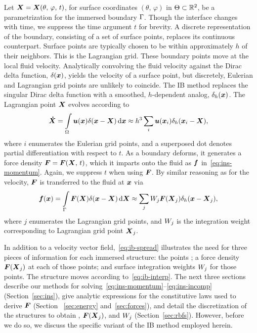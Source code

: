 Let $\boldsymbol{X} = \boldsymbol{X}(\theta,\,\varphi,\,t)$, for surface coordinates $(\theta,\,\varphi)$ in
$\Theta\subset\mathbb{R}^2$, be a parametrization for the immersed boundary $\Gamma$.
Though the interface changes with time, we suppress the time argument $t$ for brevity. A
discrete representation of the boundary, consisting of a set of surface points, replaces
its continuous counterpart.  Surface points are typically chosen to be within
approximately $h$ of their neighbors.  This is the Lagrangian grid. These boundary points
move at the local fluid velocity.  Analytically convolving the fluid velocity against the
Dirac delta function, $\delta(\boldsymbol{x})$, yields the velocity of a surface point, but
discretely, Eulerian and Lagrangian grid points are unlikely to coincide. The IB method
replaces the singular Dirac delta function with a smoothed, $h$-dependent analog,
$\delta_h(\boldsymbol{x})$. The Lagrangian point $\boldsymbol{X}$ evolves according to
\begin{equation}\label{eq:ib-interp}
    \vec{\dot{X}}
        = \int\limits_{\domain} \u(\x) \Dirac(\x-\X) \d\x
        \approx h^3 \sum_{i} \u(\x_i) \Dirac_h(\x_i-\X),
\end{equation}
where $i$ enumerates the Eulerian grid points, and a superposed dot denotes partial
differentiation with respect to $t$. As a boundary deforms, it generates a force density
$\boldsymbol{F} = \boldsymbol{F}(\boldsymbol{X},\,t)$, which it imparts onto the fluid as $\boldsymbol{f}$ in~\eqref{eq:ins-momentum}.
Again, we suppress $t$ when using $\boldsymbol{F}$. By similar reasoning as for the velocity, $\boldsymbol{F}$ is
transferred to the fluid at $\boldsymbol{x}$ via
\begin{equation}\label{eq:ib-spread}
        \f(\x)
        = \int\limits_{\interface} \F(\X)\Dirac(\x-\X) \d\X
        \approx \sum_{j} \weight[j]\F(\X_j) \Dirac_h(\x-\X_j),
\end{equation}
where $j$ enumerates the Lagrangian grid points, and $\weight[j]$ is the integration
weight corresponding to Lagrangian grid point $\boldsymbol{X}_j$. 

In addition to a velocity vector field,~\eqref{eq:ib-spread} illustrates the need for
three pieces of information for each immersed structure: the points ; a force density $\boldsymbol{F}(\boldsymbol{X}_j)$ at each of those points;
and surface integration weights $\weight[j]$ for those points. The structure moves
according to~\eqref{eq:ib-interp}. The next three sections describe our methods for
solving~\eqref{eq:ins-momentum}--\eqref{eq:ins-incomp} (Section~\ref{sec:ins}), give
analytic expressions for the constitutive laws used to derive $\boldsymbol{F}$ (Section~%
\ref{sec:energy} and~\ref{sec:forces}), and detail the discretization of the structures
to obtain , $\boldsymbol{F}(\boldsymbol{X}_j)$, and $\weight[j]$ (Section~\ref{sec:rbfs}). However,
before we do so, we discuss the specific variant of the IB method employed herein.

